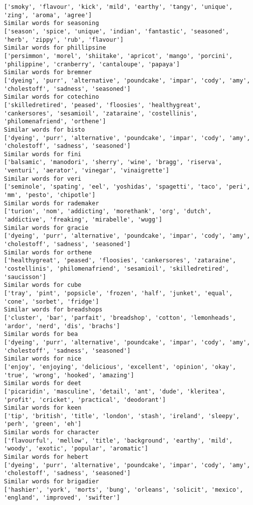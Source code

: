 \documentclass[11pt]{article}
\begin{document}
\begin{Verbatim}[commandchars=\\\{\}]
['smoky', 'flavour', 'kick', 'mild', 'earthy', 'tangy', 'unique', 'zing', 'aroma', 'agree']
Similar words for seasoning
['season', 'spice', 'unique', 'indian', 'fantastic', 'seasoned', 'herb', 'zippy', 'rub', 'flavour']
Similar words for phillipsine
['persimmon', 'morel', 'shiitake', 'apricot', 'mango', 'porcini', 'philippine', 'cranberry', 'cantaloupe', 'papaya']
Similar words for bremner
['dyeing', 'purr', 'alternative', 'poundcake', 'impar', 'cody', 'amy', 'cholestoff', 'sadness', 'seasoned']
Similar words for cotechino
['skilledretired', 'peased', 'floosies', 'healthygreat', 'cankersores', 'sesamioil', 'zataraine', 'costellinis', 'philomenafriend', 'orthene']
Similar words for bisto
['dyeing', 'purr', 'alternative', 'poundcake', 'impar', 'cody', 'amy', 'cholestoff', 'sadness', 'seasoned']
Similar words for fini
['balsamic', 'manodori', 'sherry', 'wine', 'bragg', 'riserva', 'venturi', 'aerator', 'vinegar', 'vinaigrette']
Similar words for veri
['seminole', 'spating', 'eel', 'yoshidas', 'spagetti', 'taco', 'peri', 'mm', 'pesto', 'chipotle']
Similar words for rademaker
['turion', 'nom', 'addicting', 'morethank', 'org', 'dutch', 'addictive', 'freaking', 'mirabelle', 'wugg']
Similar words for gracie
['dyeing', 'purr', 'alternative', 'poundcake', 'impar', 'cody', 'amy', 'cholestoff', 'sadness', 'seasoned']
Similar words for orthene
['healthygreat', 'peased', 'floosies', 'cankersores', 'zataraine', 'costellinis', 'philomenafriend', 'sesamioil', 'skilledretired', 'saucisson']
Similar words for cube
['tray', 'pint', 'popsicle', 'frozen', 'half', 'junket', 'equal', 'cone', 'sorbet', 'fridge']
Similar words for breadshops
['cluster', 'bar', 'parfait', 'breadshop', 'cotton', 'lemonheads', 'ardor', 'nerd', 'dis', 'brachs']
Similar words for bea
['dyeing', 'purr', 'alternative', 'poundcake', 'impar', 'cody', 'amy', 'cholestoff', 'sadness', 'seasoned']
Similar words for nice
['enjoy', 'enjoying', 'delicious', 'excellent', 'opinion', 'okay', 'true', 'wrong', 'hooked', 'amazing']
Similar words for deet
['picaridin', 'masculine', 'detail', 'ant', 'dude', 'kleritea', 'profit', 'cricket', 'practical', 'deodorant']
Similar words for keen
['tip', 'british', 'title', 'london', 'stash', 'ireland', 'sleepy', 'perh', 'green', 'eh']
Similar words for character
['flavourful', 'mellow', 'title', 'background', 'earthy', 'mild', 'woody', 'exotic', 'popular', 'aromatic']
Similar words for hebert
['dyeing', 'purr', 'alternative', 'poundcake', 'impar', 'cody', 'amy', 'cholestoff', 'sadness', 'seasoned']
Similar words for brigadier
['hashier', 'york', 'morts', 'bung', 'orleans', 'solicit', 'mexico', 'england', 'improved', 'swifter']

\end{Verbatim}
\end{document}
